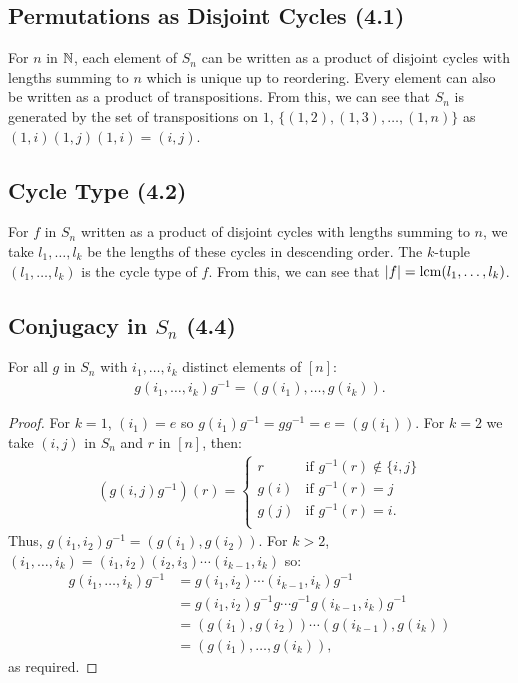 \subsection{Permutations as Disjoint Cycles (4.1)} \label{4.1}

For $n$ in $\mathbb{N}$, each element of $S_n$ can be written as a product of
disjoint cycles with lengths summing to $n$ which is unique up to reordering.
Every element can also be written as a product of transpositions.
From this, we can see that $S_n$ is generated by the set of transpositions on
$1$, $\{(1, 2), (1, 3), \ldots, (1, n)\}$ as $(1, i)(1, j)(1, i) = (i, j)$.

\subsection{Cycle Type (4.2)} \label{4.2}

For $f$ in $S_n$ written as a product of disjoint cycles with lengths summing
to $n$, we take $l_1, \ldots, l_k$ be the lengths of these cycles in
descending order. The $k$-tuple $(l_1, \ldots, l_k)$ is the cycle type of $f$.
From this, we can see that $|f| = \operatorname{lcm}(l_1, \ldots, l_k)$.

\subsection{Conjugacy in $S_n$ (4.4)} \label{4.4}

For all $g$ in $S_n$ with $i_1, \ldots, i_k$ distinct elements of $[n]$: 
\begin{align*}
    g(i_1, \ldots, i_k)g^{-1} = (g(i_1), \ldots, g(i_k)).
\end{align*}

\begin{proof}
    For $k = 1$, $(i_1) = e$ so $g(i_1)g^{-1} = gg^{-1} = e = (g(i_1))$.
    For $k = 2$ we take $(i, j)$ in $S_n$ and $r$ in $[n]$, then: \begin{align*}
        (g(i, j)g^{-1})(r) = \begin{cases}
            r    & \text{if } g^{-1}(r) \notin \{i, j\} \\
            g(i) & \text{if } g^{-1}(r) = j \\
            g(j) & \text{if } g^{-1}(r) = i. \\
        \end{cases}
    \end{align*} Thus, $g(i_1, i_2)g^{-1} = (g(i_1), g(i_2))$. For $k > 2$,
    $(i_1, \ldots, i_k) = (i_1, i_2)(i_2, i_3)\cdots(i_{k - 1}, i_k)$ so: \begin{align*}
        g(i_1, \ldots, i_k)g^{-1} 
        &= g(i_1, i_2)\cdots(i_{k - 1}, i_k)g^{-1}\\
        &= g(i_1, i_2)g^{-1}g \cdots g^{-1}g(i_{k - 1}, i_k)g^{-1}\\
        &= (g(i_1), g(i_2)) \cdots (g(i_{k - 1}), g(i_k)) \\
        &= (g(i_1), \ldots, g(i_k)),
    \end{align*} as required.
\end{proof}

